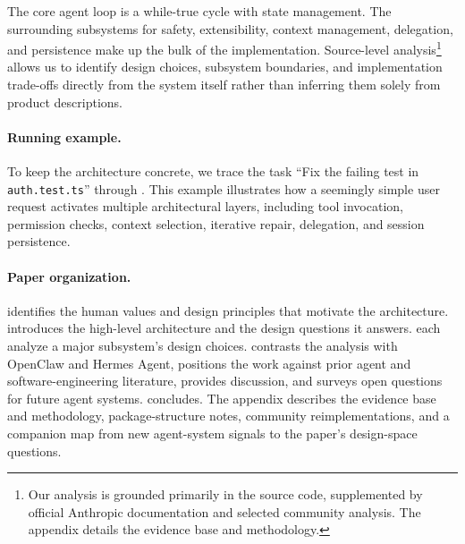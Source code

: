 The core agent loop is a while-true cycle with state management. The surrounding subsystems for safety, extensibility, context management, delegation, and persistence make up the bulk of the implementation. Source-level analysis\footnote{Our analysis is grounded primarily in the source code, supplemented by official Anthropic documentation and selected community analysis. The appendix details the evidence base and methodology.} allows us to identify design choices, subsystem boundaries, and implementation trade-offs directly from the system itself rather than inferring them solely from product descriptions.

\paragraph{Running example.} 
To keep the architecture concrete, we trace the task ``Fix the failing test in \texttt{auth.test.ts}'' through . This example illustrates how a seemingly simple user request activates multiple architectural layers, including tool invocation, permission checks, context selection, iterative repair, delegation, and session persistence.

\paragraph{Paper organization.}
 identifies the human values and design principles that motivate the architecture.  introduces the high-level architecture and the design questions it answers.  each analyze a major subsystem's design choices.  contrasts the analysis with OpenClaw and Hermes Agent,  positions the work against prior agent and software-engineering literature,  provides discussion, and  surveys open questions for future agent systems.  concludes. The appendix describes the evidence base and methodology, package-structure notes, community reimplementations, and a companion map from new agent-system signals to the paper's design-space questions.
